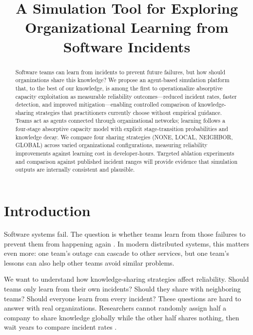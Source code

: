 \documentclass[conference,10pt]{IEEEtran}
\begin{document}
\title{A Simulation Tool for Exploring Organizational Learning from Software Incidents}

\author{
}

\maketitle

\begin{abstract}
Software teams can learn from incidents to prevent future failures, but how should organizations share this knowledge? We propose an agent-based simulation platform that, to the best of our knowledge, is among the first to operationalize absorptive capacity exploitation as measurable reliability outcomes---reduced incident rates, faster detection, and improved mitigation---enabling controlled comparison of knowledge-sharing strategies that practitioners currently choose without empirical guidance. Teams act as agents connected through organizational networks; learning follows a four-stage absorptive capacity model with explicit stage-transition probabilities and knowledge decay. We compare four sharing strategies (NONE, LOCAL, NEIGHBOR, GLOBAL) across varied organizational configurations, measuring reliability improvements against learning cost in developer-hours. Targeted ablation experiments and comparison against published incident ranges will provide evidence that simulation outputs are internally consistent and plausible.
\end{abstract}

\section{Introduction}

Software systems fail. The question is whether teams learn from those failures to prevent them from happening again \cite{cook1998}. In modern distributed systems, this matters even more: one team's outage can cascade to other services, but one team's lessons can also help other teams avoid similar problems.

We want to understand how knowledge-sharing strategies affect reliability. Should teams only learn from their own incidents? Should they share with neighboring teams? Should everyone learn from every incident? These questions are hard to answer with real organizations. Researchers cannot randomly assign half a company to share knowledge globally while the other half shares nothing, then wait years to compare incident rates \cite{harrison2007}.
\end{document}
